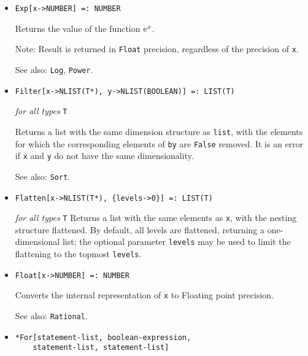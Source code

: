 \begin{itemize}
\item{}
\protect \large \begin{verbatim}
Exp[x->NUMBER] =: NUMBER 
\end{verbatim} \normalsize

\bd
Returns the value of the function ${\rm e}^{x}$.
\item [Note:] Result is returned in \verb+Float+ precision, regardless
of the precision of \verb+x+.
\item [See also:] \verb+Log+, \verb+Power+.
\ed



\item{}
\protect \large \begin{verbatim}
Filter[x->NLIST(T*), y->NLIST(BOOLEAN)] =: LIST(T)
\end{verbatim} \normalsize

{\it for all types} {\tt T}

\bd
Returns a list with the same dimension structure as \verb+list+, with the
elements for which the corresponding elements of \verb+by+ are \verb+False+
removed.  It is an error if \verb+x+ and \verb+y+ do not have the same
dimensionality.
\item [See also:] \verb+Sort+.
\ed

\item{}
\protect \large \begin{verbatim}
Flatten[x->NLIST(T*), {levels->0}] =: LIST(T) 
\end{verbatim} \normalsize

{\it for all types} {\tt T}
\bd
Returns a list with the same elements as \verb+x+, with the nesting
structure flattened.  By default, all levels are flattened, returning
a one-dimensional list; the optional parameter \verb+levels+ may be
used to limit the flattening to the topmost \verb+levels+.
\ed

\item{}
\protect \large \begin{verbatim}
Float[x->NUMBER] =: NUMBER
\end{verbatim} \normalsize

\bd Converts the internal representation of \verb+x+ to Floating point
precision.
\item [See also:] \verb+Rational+.
\ed

\item{}
\protect \large \begin{verbatim}
*For[statement-list, boolean-expression, 
    statement-list, statement-list]
\end{verbatim}\normalsize


\end{itemize}
